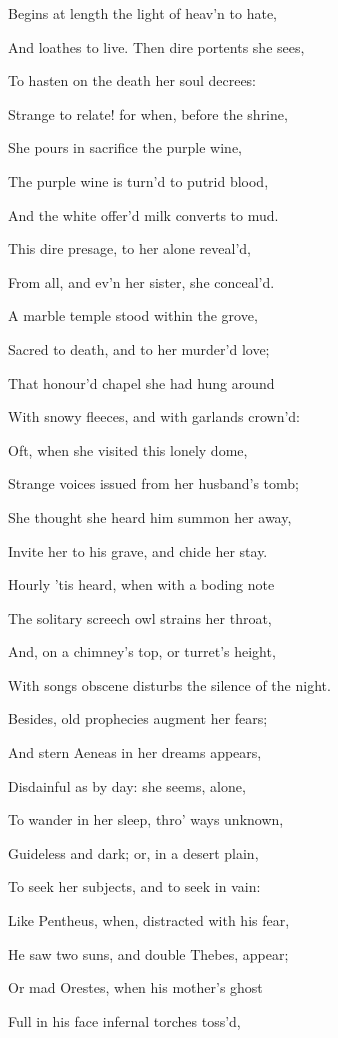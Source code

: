 Begins at length the light of heav’n to hate,

And loathes to live. Then dire portents she sees,

To hasten on the death her soul decrees:

Strange to relate! for when, before the shrine,

She pours in sacrifice the purple wine,

The purple wine is turn’d to putrid blood,

And the white offer’d milk converts to mud.

This dire presage, to her alone reveal’d,

From all, and ev’n her sister, she conceal’d.

A marble temple stood within the grove,

Sacred to death, and to her murder’d love;

That honour’d chapel she had hung around

With snowy fleeces, and with garlands crown’d:

Oft, when she visited this lonely dome,

Strange voices issued from her husband’s tomb;

She thought she heard him summon her away,

Invite her to his grave, and chide her stay.

Hourly ’tis heard, when with a boding note

The solitary screech owl strains her throat,

And, on a chimney’s top, or turret’s height,

With songs obscene disturbs the silence of the night.

Besides, old prophecies augment her fears;

And stern Aeneas in her dreams appears,

Disdainful as by day: she seems, alone,

To wander in her sleep, thro’ ways unknown,

Guideless and dark; or, in a desert plain,

To seek her subjects, and to seek in vain:

Like Pentheus, when, distracted with his fear,

He saw two suns, and double Thebes, appear;

Or mad Orestes, when his mother’s ghost

Full in his face infernal torches toss’d,

